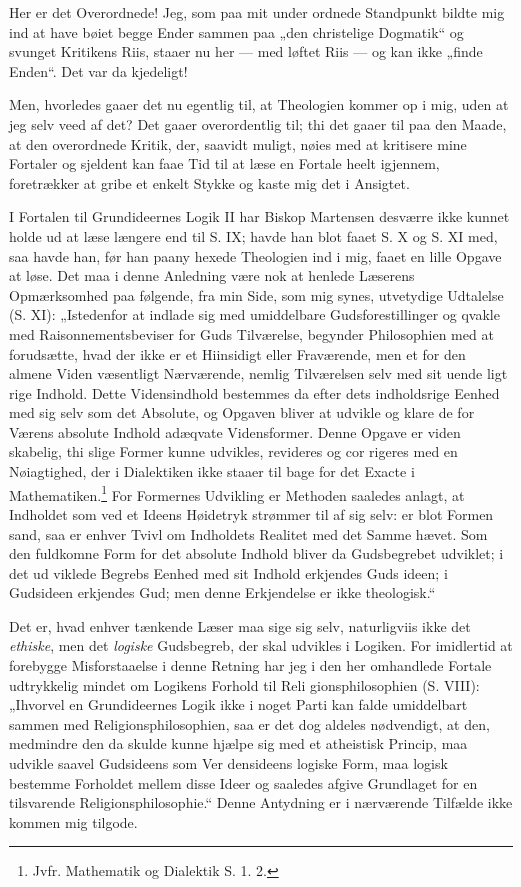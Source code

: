 \documentclass[12pt]{book}
\newcommand{\opage}[1]{\marginnote{\footnotesize\textit{[#1]}}}
\begin{document}
Her er det Overordnede! Jeg, som paa mit under\-%
ordnede Standpunkt bildte mig ind at have bøiet begge
Ender sammen paa „den christelige Dogmatik“ og svunget
Kritikens Riis, staaer nu her --- med løftet Riis --- og kan
ikke „finde Enden“. Det var da kjedeligt!

Men, hvorledes gaaer det nu egentlig til, at Theologien
kommer op i mig, uden at jeg selv veed af det? Det gaaer
overordentlig til; thi det gaaer til paa den Maade, at den
overordnede Kritik, der, saavidt muligt, nøies med at kritisere
mine Fortaler og sjeldent kan faae Tid til at læse en Fortale
heelt igjennem, foretrækker at gribe et enkelt Stykke og kaste
mig det i Ansigtet.

I Fortalen til Grundideernes Logik II har Biskop
Martensen desværre ikke kunnet holde ud at læse længere
end til S. IX; havde han blot faaet S. X og S. XI med,
saa havde han, før han paany hexede Theologien ind i mig,
faaet en lille Opgave at løse. Det maa i denne Anledning
være nok at henlede Læserens Opmærksomhed paa følgende,
fra min Side, som mig synes, utvetydige Udtalelse (S. XI):
„Istedenfor at indlade sig med umiddelbare Gudsforestillinger
og qvakle med Raisonnementsbeviser for Guds Tilværelse,
begynder Philosophien med at forudsætte, hvad der ikke er et
Hiinsidigt eller Fraværende, men et for den almene Viden
væsentligt Nærværende, nemlig Tilværelsen selv med sit uende\-%
ligt rige Indhold. Dette Vidensindhold bestemmes da efter
dets indholdsrige Eenhed med sig selv som det Absolute, og
Opgaven bliver at udvikle og klare de for Værens absolute
Indhold adæqvate Vidensformer. Denne Opgave er viden\-%
\opage{116}\setcounter{footnote}{0}%
skabelig, thi slige Former kunne udvikles, revideres og cor\-%
rigeres med en Nøiagtighed, der i Dialektiken ikke staaer til\-%
bage for det Exacte i Mathematiken.\footnote{Jvfr. Mathematik og Dialektik S. 1. 2.}
For Formernes
Udvikling er Methoden saaledes anlagt, at Indholdet som
ved et Ideens Høidetryk strømmer til af sig selv: er blot
Formen sand, saa er enhver Tvivl om Indholdets Realitet
med det Samme hævet. Som den fuldkomne Form for det
absolute Indhold bliver da Gudsbegrebet udviklet; i det ud\-%
viklede Begrebs Eenhed med sit Indhold erkjendes Guds\-%
ideen; i Gudsideen erkjendes Gud; men denne Erkjendelse
er ikke theologisk.“

Det er, hvad enhver tænkende Læser maa sige sig selv,
naturligviis ikke det \emph{ethiske}, men det \emph{logiske} Gudsbegreb,
der skal udvikles i Logiken. For imidlertid at forebygge
Misforstaaelse i denne Retning har jeg i den her omhandlede
Fortale udtrykkelig mindet om Logikens Forhold til Reli\-%
gionsphilosophien (S. VIII): „Ihvorvel en Grundideernes
Logik ikke i noget Parti kan falde umiddelbart sammen med
Religionsphilosophien, saa er det dog aldeles nødvendigt, at
den, medmindre den da skulde kunne hjælpe sig med et
atheistisk Princip, maa udvikle saavel Gudsideens som Ver\-%
densideens logiske Form, maa logisk bestemme Forholdet
mellem disse Ideer og saaledes afgive Grundlaget for en
tilsvarende Religionsphilosophie.“ Denne Antydning er i
nærværende Tilfælde ikke kommen mig tilgode.
\end{document}
